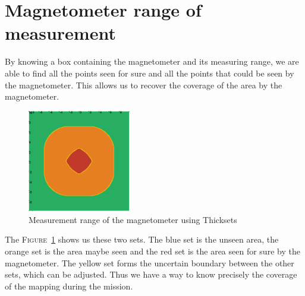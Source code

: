 \section*{Magnetometer range of measurement}
    By knowing a box containing the magnetometer and its measuring range, we are able to find all the points seen for sure and all the points that could be seen by the magnetometer. This allows us to recover the coverage of the area by the magnetometer.

    \begin{figure}[!htb]
        \centering
        \includegraphics[width=0.4\textwidth]{imgs/thickset_cmap.png}
        \caption{\label{fig:thickset} Measurement range of the magnetometer using Thicksets}
    \end{figure}

    The \textsc{Figure}~\ref{fig:thickset} shows us these two sets. The blue set is the unseen area, the orange set is the area maybe seen and the red set is the area seen for sure by the magnetometer. The yellow set forms the uncertain boundary between the other sets, which can be adjusted. Thus we have a way to know precisely the coverage of the mapping during the mission.